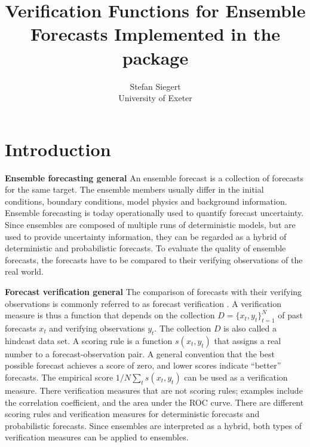 \documentclass[article]{jss}\usepackage{graphicx, color}
\author{Stefan Siegert\\University of Exeter}
\title{Verification Functions for Ensemble Forecasts Implemented in the \proglang{R} package \pkg{SpecsVerification}}
\begin{document}


\section{Introduction}

{\bf Ensemble forecasting general}
An ensemble forecast is a collection of forecasts for the same target.
The ensemble members usually differ in the initial conditions, boundary conditions, model physics and background information.
Ensemble forecasting is today operationally used to quantify forecast uncertainty.
Since ensembles are composed of multiple runs of deterministic models, but are used to provide uncertainty information, they can be regarded as a hybrid of deterministic and probabilistic forecasts.
To evaluate the quality of ensemble forecasts, the forecasts have to be compared to their verifying observations of the real world.



{\bf Forecast verification general}
The comparison of forecasts with their verifying observations is commonly referred to as forecast verification \citep{jolliffe2012forecast}.
A verification measure is thus a function that depends on the collection $D=\{x_t, y_t\}_{t=1}^N$ of past forecasts $x_t$ and verifying observations $y_t$.
The collection $D$ is also called a hindcast data set.
A scoring rule is a function $s(x_t, y_t)$ that assigns a real number to a forecast-observation pair.
A general convention that the best possible forecast achieves a score of zero, and lower scores indicate ``better'' forecasts.
The empirical score $1/N \sum_t s(x_t, y_t)$ can be used as a verification measure.
There verification measures that are not scoring rules; examples include the correlation coefficient, and the area under the ROC curve.
There are different scoring rules and verification measures for deterministic forecasts and probabilistic forecasts.
Since ensembles are interpreted as a hybrid, both types of verification measures can be applied to ensembles.
\end{document}
